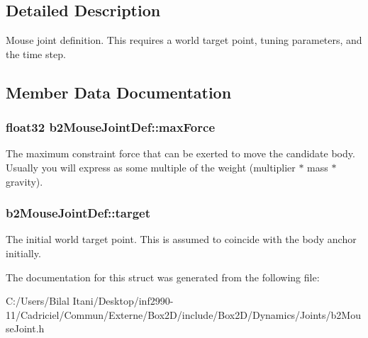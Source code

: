 \subsection{Detailed Description}
Mouse joint definition. This requires a world target point, tuning parameters, and the time step. 

\subsection{Member Data Documentation}
\subsubsection[{\texorpdfstring{max\+Force}{maxForce}}]{\setlength{\rightskip}{0pt plus 5cm}float32 b2\+Mouse\+Joint\+Def\+::max\+Force}\hypertarget{structb2_mouse_joint_def_ae9c52b3afda8ed006eb62fad163cdc3b}{}\label{structb2_mouse_joint_def_ae9c52b3afda8ed006eb62fad163cdc3b}
The maximum constraint force that can be exerted to move the candidate body. Usually you will express as some multiple of the weight (multiplier $\ast$ mass $\ast$ gravity). 
\subsubsection[{\texorpdfstring{target}{target}}]{ b2\+Mouse\+Joint\+Def\+::target}\hypertarget{structb2_mouse_joint_def_aa1b76f72df9aca8d42bdc3e9922e310a}{}\label{structb2_mouse_joint_def_aa1b76f72df9aca8d42bdc3e9922e310a}
The initial world target point. This is assumed to coincide with the body anchor initially. 

The documentation for this struct was generated from the following file\+:\begin{DoxyCompactItemize}
\item 
C\+:/\+Users/\+Bilal Itani/\+Desktop/inf2990-\/11/\+Cadriciel/\+Commun/\+Externe/\+Box2\+D/include/\+Box2\+D/\+Dynamics/\+Joints/b2\+Mouse\+Joint.\+h\end{DoxyCompactItemize}
